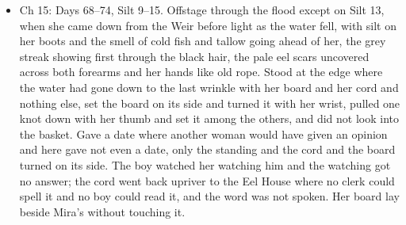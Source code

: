 \documentclass{design/chronicle}
\begin{document}
{\begin{itemize}[leftmargin=1.4em,itemsep=1pt,topsep=3pt,parsep=0pt]

\item Ch 15: Days 68–74, Silt 9–15. Offstage through the flood except on Silt 13, when she came down from the Weir before light as the water fell, with silt on her boots and the smell of cold fish and tallow going ahead of her, the grey streak showing first through the black hair, the pale eel scars uncovered across both forearms and her hands like old rope. Stood at the edge where the water had gone down to the last wrinkle with her board and her cord and nothing else, set the board on its side and turned it with her wrist, pulled one knot down with her thumb and set it among the others, and did not look into the basket. Gave a date where another woman would have given an opinion and here gave not even a date, only the standing and the cord and the board turned on its side. The boy watched her watching him and the watching got no answer; the cord went back upriver to the Eel House where no clerk could spell it and no boy could read it, and the word was not spoken. Her board lay beside Mira’s without touching it.

\end{itemize}
}
\end{document}
